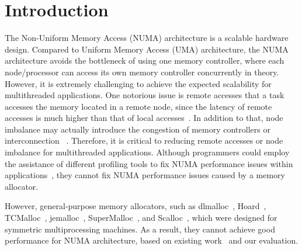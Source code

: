 


\section{Introduction}
\label{sec:intro}

The Non-Uniform Memory Access (NUMA) architecture is a scalable hardware design. Compared to Uniform Memory Access (UMA) architecture, the NUMA architecture avoids the bottleneck of using one memory controller, where each node/processor can access its own memory controller concurrently in theory. However, it is extremely challenging to achieve the expected scalability for multithreaded applications. One notorious issue is remote accesses that a task accesses the memory located in a remote node, since the latency of remote accesses is much higher than that of local accesses~\cite{Blagodurov:2011:CNC:2002181.2002182}. In addition to that, node imbalance may actually introduce the congestion of memory controllers or interconnection ~\cite{Blagodurov:2011:CNC:2002181.2002182}. Therefore, it is critical to reducing remote accesses or node imbalance for multithreaded applications. Although programmers could employ the assistance of different profiling tools to fix NUMA performance issues within applications~\cite{Intel:VTune, Memphis, Lachaize:2012:MMP:2342821.2342826, XuNuma, NumaMMA, 7847070, NumaPerf}, they cannot fix NUMA performance issues caused by a memory allocator.

However, general-purpose memory allocators, such as dlmalloc~\cite{dlmalloc},  Hoard~\cite{Hoard}, TCMalloc~\cite{tcmalloc}, jemalloc~\cite{jemalloc}, SuperMalloc~\cite{supermalloc}, and  Scalloc~\cite{Scalloc}, which were designed for symmetric multiprocessing machines. As a result, they cannot achieve good performance for NUMA architecture, based on existing work~\cite{tcmallocnew, yang2019jarena} and our evaluation. 

